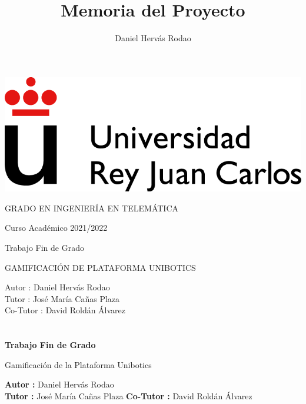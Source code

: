 \documentclass[a4paper, 12pt]{book}
\title{Memoria del Proyecto}
\author{Daniel Hervás Rodao}
\begin{document}
\renewcommand{\refname}{Bibliografía}  %
\renewcommand{\appendixname}{Apéndice}


\begin{titlepage}
\begin{center}
\includegraphics[scale=0.8]{img/URJ_logo_Color_POS.png}

\vspace{1.75cm}

\Large
GRADO EN INGENIERÍA EN TELEMÁTICA

\vspace{0.4cm}

\large
Curso Académico 2021/2022

\vspace{0.8cm}

Trabajo Fin de Grado

\vspace{2.5cm}

\LARGE
GAMIFICACIÓN DE PLATAFORMA UNIBOTICS

\vspace{4cm}

\large
Autor : Daniel Hervás Rodao \\
Tutor : José María Cañas Plaza \\
Co-Tutor : David Roldán Álvarez
\end{center}
\end{titlepage}

\newpage
\mbox{}
\thispagestyle{empty} %


\clearpage
{}
\chapter*{}

\vspace{-4cm}
\begin{center}
\LARGE
\textbf{Trabajo Fin de Grado}

\vspace{1cm}
\large
Gamificación de la Plataforma Unibotics

\vspace{1cm}
\large
\textbf{Autor :} Daniel Hervás Rodao \\
\textbf{Tutor :} José María Cañas Plaza
\textbf{Co-Tutor :} David Roldán Álvarez

\end{center}
\end{document}
